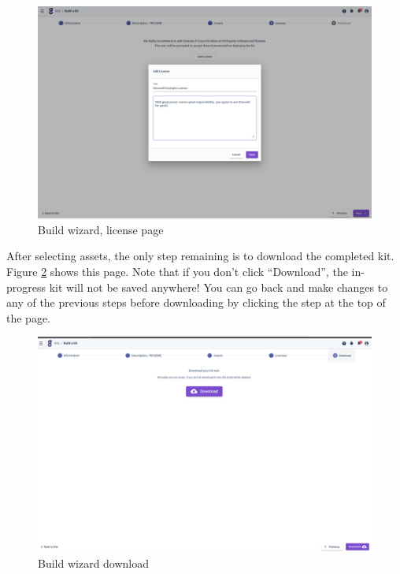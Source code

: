 \begin{figure}[H]
	\includegraphics[width=0.8\linewidth]{images/buildwizard4.png}
	\caption{Build wizard, license page}
	\label{fig:buildwizard4}
\end{figure}

After selecting assets, the only step remaining is to download the completed kit. Figure \ref{fig:buildwizard5} shows this page. Note that if you don't click ``Download'', the in-progress kit will not be saved anywhere! You can go back and make changes to any of the previous steps before downloading by clicking the step at the top of the page.

\begin{figure}[H]
	\includegraphics[width=0.8\linewidth]{images/buildwizard5.png}
	\caption{Build wizard download}
	\label{fig:buildwizard5}
\end{figure}
